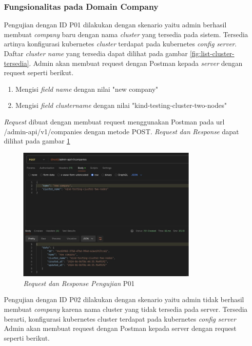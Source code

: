 \subsubsection{Fungsionalitas pada Domain Company}

Pengujian dengan ID P01 dilakukan dengan skenario yaitu admin berhasil membuat \textit{company} baru dengan nama \textit{cluster} yang tersedia pada sistem. Tersedia artinya konfigurasi kubernetes \textit{cluster} terdapat pada kubernetes \textit{config server}. Daftar \textit{cluster name} yang tersedia dapat dilihat pada gambar \ref{fig:list-cluster-tersedia}. Admin akan membuat request dengan Postman kepada \textit{server} dengan request seperti berikut.

\begin{enumerate}
  \item Mengisi \textit{field name} dengan nilai "new company"
  \item Mengisi \textit{field cluster\textunderscore name} dengan nilai "kind-testing-cluster-two-nodes"
\end{enumerate}

\textit{Request} dibuat dengan membuat request menggunakan Postman pada url /admin-api/v1/companies dengan metode POST. \textit{Request dan Response} dapat dilihat pada gambar \ref{fig:pengujian-p01}

\begin{figure}[ht]
  \centering
  \includegraphics[width=0.8\textwidth]{resources/chapter-4/pengujian/p01.jpg}
  \caption{\textit{Request dan Response Pengujian} P01}
  \label{fig:pengujian-p01}
\end{figure}

Pengujian dengan ID P02 dilakukan dengan skenario yaitu admin tidak berhasil membuat \textit{company} karena nama cluster yang tidak tersedia pada server. Tersedia berarti, konfigurasi kubernetes cluster terdapat pada kubernetes \textit{config server} Admin akan membuat request dengan Postman kepada server dengan request seperti berikut.

